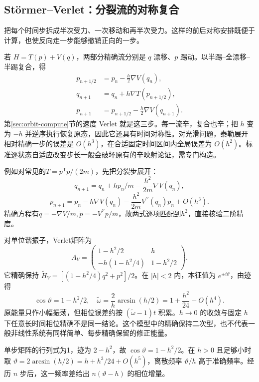 \subsection{Störmer--Verlet：分裂流的对称复合}
把每个时间步拆成半次受力、一次移动和再半次受力。这样的前后对称安排既便于计算，也使反向走一步能够撤销正向的一步。

若 $H=T(p)+V(q)$，两部分精确流分别是 $q$ 漂移、$p$ 踢动。以半踢--全漂移--半踢复合，得
\begin{equation}
\begin{aligned}
p_{n+1/2}&=p_n-\tfrac h2\nabla V(q_n),\\
q_{n+1}&=q_n+h\nabla T(p_{n+1/2}),\\
p_{n+1}&=p_{n+1/2}-\tfrac h2\nabla V(q_{n+1}).
\end{aligned}
\label{eq:ham-verlet}
\end{equation}
第\ref{sec:orbit-compute}节的速度 Verlet 就是这三步。每一流辛，复合也辛；把 $h$ 变为 $-h$ 并逆序执行恢复原态，因此它还具有时间对称性。对光滑问题，泰勒展开相对精确一步的误差是 $O(h^3)$，在合适固定时间区间内全局误差为 $O(h^2)$。标准逐状态自适应改变步长一般会破坏原有的辛映射论证，需专门构造。

例如对常见的$T=p^{\mathsf T}p/(2m)$，先把分裂步展开：
\[
q_{n+1}=q_n+hp_n/m-\frac{h^2}{2m}\nabla V(q_n),
\]
\[
p_{n+1}=p_n-h\nabla V(q_n)-\frac{h^2}{2m}V^{\prime\prime}(q_n)p_n+O(h^3).
\]
精确方程有$\ddot q=-\nabla V/m,\ddot p=-V^{\prime\prime}p/m$，故两式逐项匹配到$h^2$，直接核验二阶精度。

\begin{example}
对单位谐振子，Verlet矩阵为
\[
A_V=\begin{pmatrix}1-h^2/2&h\\-h(1-h^2/4)&1-h^2/2\end{pmatrix}.
\]
它精确保持 $\widetilde H_V=[(1-h^2/4)q^2+p^2]/2$。在 $|h|<2$ 内，本征值为 $e^{\pm i\vartheta}$，由迹得
\[
\cos\vartheta=1-h^2/2,\quad
\widetilde\omega=\frac2h\arcsin(h/2)=1+\frac{h^2}{24}+O(h^4).
\]
原能量只作小幅振荡，但相位误差约按 $(\widetilde\omega-1)t$ 积累。$h\to0$ 的收敛与固定 $h$ 下任意长时间相位精确不是同一结论。这个模型中的精确保持二次型，也不代表一般非线性系统有同样简单、每步精确保留的修正能量。

单步矩阵的行列式为1，迹为 $2-h^2$，故 $\cos\vartheta=1-h^2/2$。在 $h>0$ 且足够小时取 $\vartheta=2\arcsin(h/2)=h+h^3/24+O(h^5)$，离散频率 $\vartheta/h$ 高于准确频率。经历 $n$ 步后，这一频率差给出 $n(\vartheta-h)$ 的相位增量。
\end{example}

